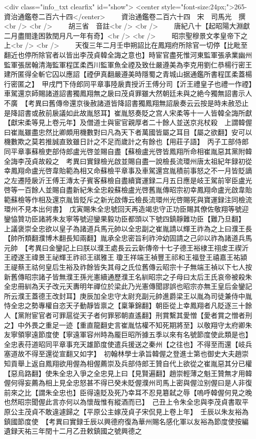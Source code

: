 <div class="info_txt clearfix" id="show">
<center style="font-size:24px;">265-資治通鑑卷二百六十四</center>
  　　資治通鑑卷二百六十四　宋　司馬光　撰<br />
<br />
　　胡三省　音註<br />
<br />
　　唐紀八十【起昭陽大淵獻二月盡閤逢困敦閏月凡一年有奇】<br />
<br />
　　昭宗聖穆景文孝皇帝下之上<br />
<br />
　　天復三年二月壬申朔詔比在鳳翔府所除官一切停【比毗至翻近也停所除官者以皆出李茂貞韓全誨之意也】時宦官盡死惟河東監軍張承業幽州監軍張居翰清海監軍程匡柔西川監軍魚全禋及致仕嚴遵美為李克用劉仁恭楊行密王建所匿得全斬它囚以應詔【禋伊真翻嚴遵美時隱蜀之青城山据通鑑所書程匡柔蓋楊行密匿之】　甲戌門下侍郎同平章事陸扆責授沂王傅分司【沂王禮皇子也禮一作禋】車駕還京師賜諸道詔書獨鳳翔無之扆曰茂貞罪雖大然朝廷未與之絶今獨無詔書示人不廣　【考異曰舊傳帝還京後赦諸道皆降詔書獨鳳翔無詔扆奏云云按是時未赦恐止是降詔書或赦前扆議如此故胤怒耳】崔胤怒奏貶之宫人宋柔等十一人皆韓全誨所獻【獻宋柔等見上卷元年】及僧道士與宦官親厚者二十餘人並送京兆杖殺　上謂韓偓曰崔胤雖盡忠然比卿頗用機數對曰凡為天下者萬國皆屬之耳目【屬之欲翻】安可以機數欺之莫若推誠直致雖日計之不足而歲計之有餘也【用莊子語】　丙子工部侍郎同平章事蘇檢吏部侍郎盧光啓並賜自盡【蘇檢盧光啓皆鳳翔所命相崔胤惡其黨附韓全誨李茂貞故殺之　考異曰實録檢光啟並賜自盡一說檢長流環州唐太祖紀年録初從幸鳳翔命盧光啓韋貽範為相又命蘇檢平章事及車駕還宫胤積前事怒之不一月皆貶謫之左遷陸扆沂王傅王漙太子賓客蘇檢自盡續寶運録二月五日應是岐王駕前宰臣盧光啓等一百餘人並賜自盡新紀朱全忠殺蘇檢盧光啓舊胤傳昭宗初幸鳳翔命盧光啟韋貽範蘇檢等作相及還京胤皆貶斥之新光啟傳云檢長流環州光啓賜死與寶運録注同檢流環州不見本出何書】　戊寅賜朱全忠號回天再造竭忠守正功臣賜其僚佐敬翔等號迎鑾恊贊功臣諸將朱友寧等號迎鑾果毅功臣都頭以下號四鎮靜難功臣【難乃旦翻】　上議褒崇全忠欲以皇子為諸道兵馬元帥以全忠副之崔胤請以輝王祚為之上曰濮王長【帥所類翻濮博木翻長知兩翻】胤承全忠密旨利祚沖幼固請之己卯以祚為諸道兵馬元帥　【考異曰金鑾記上曰朕以濮王處長云云新傳帝十七子德王裕棣王祤䖍王禊沂王禋遂王禕景王祕輝王祚祁王祺雅王瓊王祥端王禎豐王祁和王福登王禧嘉王祐潁王禔蔡王祜何皇后生裕及祚餘皆失其母之氏位舊傳云昭宗十子無端王禎以下七人按新舊傳昭宗諸子皆無濮王孫光憲續通歷濮王名紃昭宗之子母曰太后王氏哀帝被殺朱全忠冊紃為天子改元天夀明年禪位於梁此乃光憲傳聞謬誤也昭宗亦無王皇后金鑾記所云濮王蓋德王改封耳】庚辰加全忠守太尉充副元帥進爵梁王以胤為司徒兼侍中胤恃全忠之勢專權自恣天子動靜皆禀之【稟筆錦翻】朝臣從上幸鳳翔者凡貶逐三十餘人【黨附宦官者可罪扈從天子者何罪邪朝直遙翻】刑賞繫其愛憎【愛者賞之憎者刑之】中外畏之重足一迹【重直龍翻史言崔胤怙權不知死期將至】以敬翔守太府卿朱友寧領寧遠節度使【寧遠軍容州時為龎巨昭所據五季以來有名號節度使此類是也】全忠表苻道昭同平章事充天雄節度使遣兵援送之秦州【之往也】不得至而還【岐兵塞道故不得至還從宣翻又如字】　初翰林學士承旨韓偓之登進士第也御史大夫趙崇知貢舉上返自鳳翔欲用偓為相偓薦崇及兵部侍郎王贊自代上欲從之崔胤惡其分已權【惡烏路翻】使朱全忠入爭之全忠見上曰【見賢遍翻】趙崇輕薄之魁王贊無才用韓偓何得妄薦為相上見全忠怒甚不得已癸未貶偓濮州司馬上密與偓泣别偓曰是人非復前來之比【謂朱全忠也】臣得遠貶及死乃幸耳不忍見簒弑之辱【嗚呼韓偓何見之晚也然昭宗聞偓此言亦何以為懷哉惟有縱酒而已】　己丑上令朱全忠與李茂貞書取平原公主茂貞不敢違遽歸之【平原公主嫁茂貞子宋侃見上卷上年】　壬辰以朱友裕為鎮國節度使　【考異曰實録壬辰以興德府復為華州賜名感化軍以友裕為節度使按編遺録天祐三年閏十二月乙丑敕鎮國之號興德之
